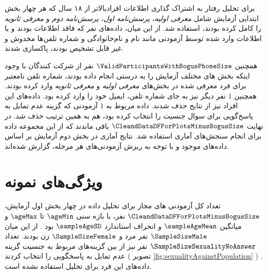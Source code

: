 برای تحلیل رفتار به اشتراک گذاری اطلاعات افرادبالاتر از ۱۸ سال که هر چهار بخش ابتدایی آزمایش شامل
\textit{معرفی اولیه}،
\textit{پرسش‌نامه اول}،
\textit{پرسش‌نامه دوم} و
\textit{معرفی ثانویه}
را کامل کرده بودند، استفاده شد.
از این میان، داده‌های
\BogusEmailDataBogusNoLandingPageDateData
نفر
که فاقد اطلاعات بودند و یا اطلاعات وارد شده توسط آزمودنی
مانند نام و نام‌خانوادگی و شماره تلفن‌ها مخدوش و غیر قابل تشخیص بودند، پاکسازی شدند.

همچنین
$\ValidParticipantsWithBogusPhoneSize$
نفر  از شرکت کنندگان با وجود اینکه
بخش های مختلف آزمایش را به درستی انجام داده بودند، شماره تلفن نامعتبر
برای فرد معرفی شده در بخش‌های
\textit{معرفی اولیه}
و
\textit{معرفی ثانویه}
وارد کرده بودند. همچنین
$1$
نفر دیگر نیز به جای شماره تلفن، ایمیل خود را وارد کرده بود. داده‌های این افراد نیز از نتایج حذف شدند.
داده مربوط به
$1$
آزمودنی که گزینه عدم تمایل به پاسخ‌گویی برای سوال جنسیت را انتخاب کرده بود، هم به همین ترتیب حذف شد.
در نهایت
$\CleandDataDFForPlotsMinusBogusSize$
باقی ماندند که از این مجموعه داده برای انجام سنجش‌های آماری استفاده شد.
نتایج آماری در بخش دوم آزمایش بر اساس داده‌های موجود و با توجه به ریزش آزمودنی‌های هر مرحله، گزارش شده‌اند.
\section{ویژگی‌های نمونه}
تعداد کل آزمودنی های مجاز برای تحلیل داده در چهار بخش اول آزمایش،
$\CleandDataDFForPlotsMinusBogusSize$
نفر،
با بازه سنی
$\ageMin$
تا
$\ageMax$
و
میانگین
$\sampleAgeMean$
و انحراف استاندارد
$\sampleAgeSD$
بود
\!.
از این میان
$\SampleSizeMale$
نفر مرد و
$\SampleSizeFemale$
زن بودند.
تعداد
$\SampleSizeSexualityNoAnswer$
نفر
نیز از بین گزینه‌های مربوط به جنسیت گزینه عدم تمایل به پاسخگویی را انتخاب کردند
(
تصویر \ref{fig:sexualityAgainstPopulation}
)
\!.
داده‌های این فرد برای تحلیل‌ استفاده نشده است.


% 

